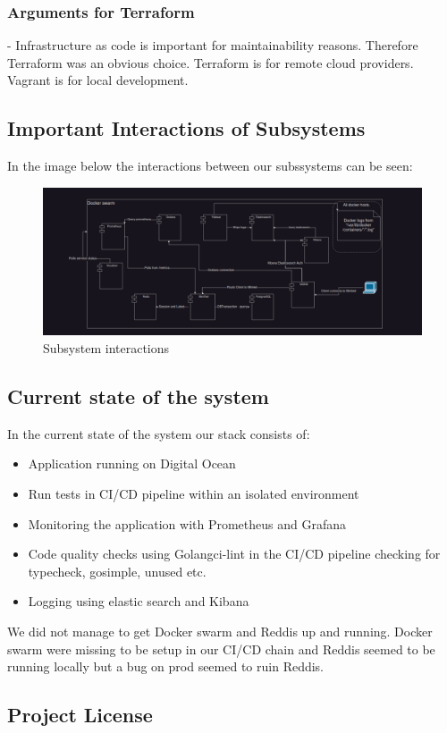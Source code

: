 \subsubsection{Arguments for Terraform}
- Infrastructure as code is important for maintainability reasons. Therefore Terraform was an obvious choice.
Terraform is for remote cloud providers. Vagrant is for local development. 

\subsection{Important Interactions of Subsystems}
In the image below the interactions between our subssystems can be seen:

\begin{figure}[H]
    \centering
    \captionsetup{justification=centering,margin=1cm}
    \includegraphics[width=0.8\linewidth]{report/images/InteractionsOfSystems.png}
    \caption{Subsystem interactions}
    \label{fig:minitwit}
\end{figure}

\subsection{Current state of the system}
In the current state of the system our stack consists of: 
\begin{itemize}
    \item Application running on Digital Ocean
    \item Run tests in CI/CD pipeline within an isolated environment
    \item Monitoring the application with Prometheus and Grafana
    \item Code quality checks using Golangci-lint in the CI/CD pipeline checking for typecheck, gosimple, unused etc.
    \item Logging using elastic search and Kibana
\end{itemize}
We did not manage to get Docker swarm and Reddis up and running. Docker swarm were missing to be setup 
in our CI/CD chain and Reddis seemed to be running locally but a bug on prod seemed to ruin Reddis.

\subsection{Project License}
